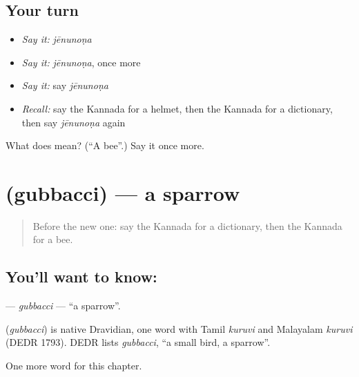 \subsection*{Your turn}
\begin{itemize}
\raggedright
  \item \emph{Say it:} \emph{jēnunoṇa}
  \item \emph{Say it:} \emph{jēnunoṇa}, once more
  \item \emph{Say it:} say \emph{jēnunoṇa}
  \item \emph{Recall:} say the Kannada for a helmet, then the Kannada for a dictionary, then say \emph{jēnunoṇa} again
\end{itemize}

\begin{tcolorbox}[breakable,colback=teal!4,colframe=teal!35!black,title={Before you move on}]
What does  mean? (\textquotedblleft{}A bee\textquotedblright{}.) Say it once more.
\end{tcolorbox}
\section[\texorpdfstring{\kn{ಗುಬ್ಬಚ್ಚಿ} (gubbacci)}{ಗುಬ್ಬಚ್ಚಿ (gubbacci)}]{ (gubbacci) — a sparrow}

\label{lesson:KA-C297-gubbacci}



\begin{quote}
Before the new one: say the Kannada for a dictionary, then the Kannada for a bee.
\end{quote}

\subsection*{You'll want to know: }
\textbf{} — \emph{gubbacci} — \textquotedblleft{}a sparrow\textquotedblright{}.

\begin{cousinweb}
\textbf{} (\emph{gubbacci}) is native Dravidian, one word with Tamil \emph{kuruvi} and Malayalam \emph{kuruvi} (DEDR 1793). DEDR lists \emph{gubbacci}, \textquotedblleft{}a small bird, a sparrow\textquotedblright{}.
\end{cousinweb}

\begin{grammarlens}[title={What you've built}]
One more word for this chapter.
\end{grammarlens}


